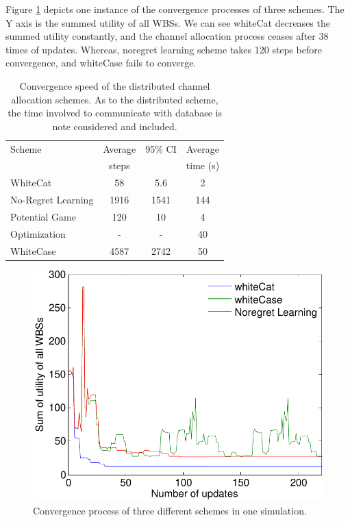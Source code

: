 \documentclass[times]{ettauth}
\theoremstyle{mytheoremstyle}
\theoremstyle{mytheoremstyle}
\theoremstyle{mytheoremstyle}
\begin{document}
Figure \ref{convergeComp} depicts one instance of the convergence processes of three schemes.
The Y axis is the summed utility of all WBSs.
We can see whiteCat decreases the summed utility constantly, and the channel allocation process ceases after 38 times of updates.
Whereas, noregret learning scheme takes 120 steps before convergence, and whiteCase fails to converge.
\begin{table}[!h]
\centering
\begin{tabular}{|l|c|c|c|}
  \hline
  Scheme			 						& Average  	 		& 95\% CI			&Average \\
  												& steps					&							&time (s) \\
    \hhline{|=|=|=|=|}
  WhiteCat									& 58						& 5.6						&2\\\hline
  No-Regret Learning									& 1916						& 1541						&144\\\hline
  Potential Game~\cite{pimrc_2012}			& 120						& 10						&4\\\hline
  Optimization						& -                         & -                         &40\\\hline
  WhiteCase 								& 4587 						& 2742						&50\\  
  \hline
\end{tabular}
\caption{Convergence speed of the distributed channel allocation schemes. As to the distributed scheme, the time involved to communicate with database is note considered and included.}
\label{convergencespeed}
\end{table}


\begin{figure}[h!]
  \centering
  \includegraphics[width=0.8\linewidth]{convergence.pdf}
  \caption{Convergence process of three different schemes in one simulation.}
\label{convergeComp}
\end{figure}
\end{document}
